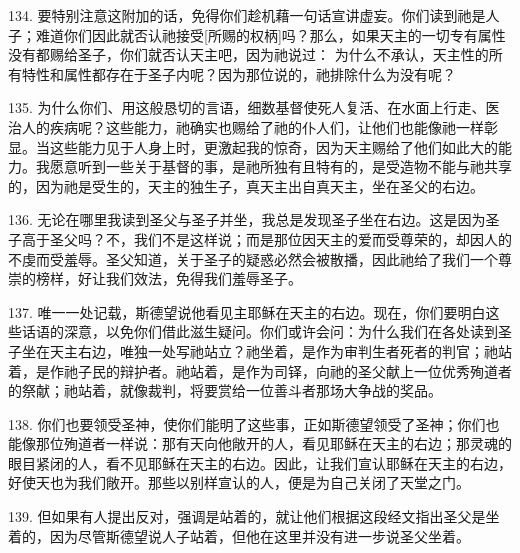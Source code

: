 134.   要特别注意这附加的话，免得你们趁机藉一句话宣讲虚妄。你们读到祂是人子；难道你们因此就否认祂接受[所赐的权柄]吗？那么，如果天主的一切专有属性没有都赐给圣子，你们就否认天主吧，因为祂说过：  为什么不承认，天主性的所有特性和属性都存在于圣子内呢？因为那位说的，祂排除什么为没有呢？\par

135. 为什么你们、用这般恳切的言语，细数基督使死人复活、在水面上行走、医治人的疾病呢？这些能力，祂确实也赐给了祂的仆人们，让他们也能像祂一样彰显。当这些能力见于人身上时，更激起我的惊奇，因为天主赐给了他们如此大的能力。我愿意听到一些关于基督的事，是祂所独有且特有的，是受造物不能与祂共享的，因为祂是受生的，天主的独生子，真天主出自真天主，坐在圣父的右边。\par

136. 无论在哪里我读到圣父与圣子并坐，我总是发现圣子坐在右边。这是因为圣子高于圣父吗？不，我们不是这样说；而是那位因天主的爱而受尊荣的，却因人的不虔而受羞辱。圣父知道，关于圣子的疑惑必然会被散播，因此祂给了我们一个尊崇的榜样，好让我们效法，免得我们羞辱圣子。\par

\par

137. 唯一一处记载，斯德望说他看见主耶稣在天主的右边。现在，你们要明白这些话语的深意，以免你们借此滋生疑问。你们或许会问：为什么我们在各处读到圣子坐在天主右边，唯独一处写祂站立？祂坐着，是作为审判生者死者的判官；祂站着，是作祂子民的辩护者。祂站着，是作为司铎，向祂的圣父献上一位优秀殉道者的祭献；祂站着，就像裁判，将要赏给一位善斗者那场大争战的奖品。\par

138. 你们也要领受圣神，使你们能明了这些事，正如斯德望领受了圣神；你们也能像那位殉道者一样说：那有天向他敞开的人，看见耶稣在天主的右边；那灵魂的眼目紧闭的人，看不见耶稣在天主的右边。因此，让我们宣认耶稣在天主的右边，好使天也为我们敞开。那些以别样宣认的人，便是为自己关闭了天堂之门。\par

139. 但如果有人提出反对，强调是站着的，就让他们根据这段经文指出圣父是坐着的，因为尽管斯德望说人子站着，但他在这里并没有进一步说圣父坐着。\par

